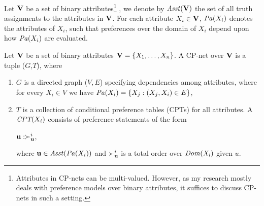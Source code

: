 Let $\textbf{V}$ be a set of binary attributes\footnote{
	Attributes in CP-nets can be multi-valued. However,
	as my research mostly deals with preference models over
	binary attributes, it suffices to discuss CP-nets
	in such a setting.
}
, we denote by $\mathit{Asst}(\textbf{V})$ the set of
all truth assignments to the attributes in $\textbf{V}$.
For each attribute $X_i \in \textbf{V}$, $\mathit{Pa}(X_i)$ denotes the  attributes of
$X_i$, such that preferences over the domain of $X_i$ depend upon how
$\mathit{Pa}(X_i)$ are evaluated.
%
%

\begin{definition}
\label{def:cpn}
	Let $\textbf{V}$ be a set of binary attributes $\textbf{V}=\{X_1,\ldots,X_n\}$.
	A CP-net over $\textbf{V}$ is a tuple ($G$,$T$), where
	\begin{enumerate} \itemsep -4pt
		\item $G$ is a directed graph ($V,E$) specifying
					dependencies among attributes,
					where for every $X_i \in V$ we have
					$\mathit{Pa}(X_i)=\{X_j:(X_j,X_i) \in E\}$,
		\item $T$ is a collection of 
					conditional preference tables (CPTs) for
					all attributes.  A $\textit{CPT}(X_i)$ consists of preference
					statements of the form
					\begin{center}
						$\textbf{u} : \succ^i_{\textbf{u}}$,
					\end{center}
					where $\textbf{u} \in \mathit{Asst}(\mathit{Pa}(X_i))$ and $\succ^i_{\textbf{u}}$
					is a total order over $\it{Dom}(X_i)$ given $u$.
	\end{enumerate}
\end{definition}

